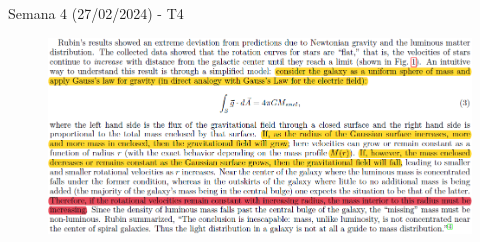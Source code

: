 \begin{frame}{Semana 4 (27/02/2024) - T4}
    
    \begin{figure}
        \centering        \includegraphics[width=1\textwidth,height=0.7\textwidth]{figures/t4t1.png}
    \end{figure}

\end{frame}

